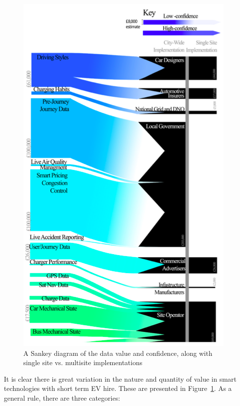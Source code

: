 \documentclass[conference]{IEEEtran}
\begin{document}
\begin{figure}[!htp]
\centering
\includegraphics[width=\columnwidth]{images/sankey.png}
\caption{A Sankey diagram of the data value and confidence, along with
  single site vs. multisite implementations}
\label{fig:sankey}
\end{figure}

It is clear there is great variation in the nature and quantity of
value in smart technologies with short term EV hire. These are
presented in Figure~\ref{fig:sankey}. As a general rule, there are
three categories: 
\end{document}
